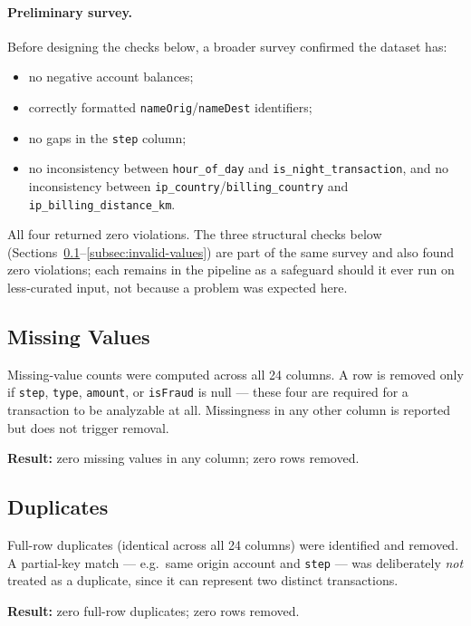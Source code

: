 \paragraph{Preliminary survey.} Before designing the checks below, a broader survey confirmed the dataset has:
\begin{itemize}
    \item no negative account balances;
    \item correctly formatted \texttt{nameOrig}/\texttt{nameDest} identifiers;
    \item no gaps in the \texttt{step} column;
    \item no inconsistency between \texttt{hour\_of\_day} and \texttt{is\_night\_transaction}, and no inconsistency between \texttt{ip\_country}/\texttt{billing\_country} and \texttt{ip\_billing\_distance\_km}.
\end{itemize}
All four returned zero violations. The three structural checks below (Sections~\ref{subsec:missing-values}--\ref{subsec:invalid-values}) are part of the same survey and also found zero violations; each remains in the pipeline as a safeguard should it ever run on less-curated input, not because a problem was expected here.

\subsection{Missing Values}
\label{subsec:missing-values}

Missing-value counts were computed across all 24 columns. A row is removed only if \texttt{step}, \texttt{type}, \texttt{amount}, or \texttt{isFraud} is null --- these four are required for a transaction to be analyzable at all. Missingness in any other column is reported but does not trigger removal.

\textbf{Result:} zero missing values in any column; zero rows removed.

\subsection{Duplicates}
\label{subsec:duplicates}

Full-row duplicates (identical across all 24 columns) were identified and removed. A partial-key match --- e.g.\ same origin account and \texttt{step} --- was deliberately \emph{not} treated as a duplicate, since it can represent two distinct transactions.

\textbf{Result:} zero full-row duplicates; zero rows removed.

